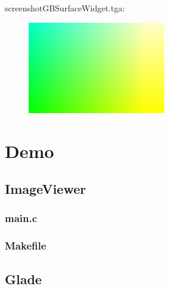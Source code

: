 screenshotGBSurfaceWidget.tga:\\
\begin{center}
\begin{figure}[H]
\centering\includegraphics[width=6cm]{./screenshotGBSurfaceWidget.png}\\
\end{figure}
\end{center}

\section{Demo}

\subsection{ImageViewer}

\subsubsection{main.c}

\begin{scriptsize}
\begin{ttfamily}

\end{ttfamily}
\end{scriptsize}

\subsubsection{Makefile}

\begin{scriptsize}
\begin{ttfamily}

\end{ttfamily}
\end{scriptsize}

\subsection{Glade}


